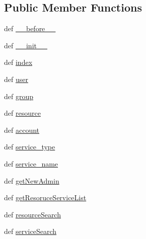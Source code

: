 \subsection*{\-Public \-Member \-Functions}
\begin{DoxyCompactItemize}
\item 
def \hyperlink{classcyberweb_1_1controllers_1_1newadmin_1_1_newadmin_controller_aaf6cba7e0a7b3e921f8355aafdafc609}{\-\_\-\-\_\-before\-\_\-\-\_\-}
\item 
def \hyperlink{classcyberweb_1_1controllers_1_1newadmin_1_1_newadmin_controller_aab476c078dd290a5cf3b643f9bf8e8d4}{\-\_\-\-\_\-init\-\_\-\-\_\-}
\item 
def \hyperlink{classcyberweb_1_1controllers_1_1newadmin_1_1_newadmin_controller_a6c8dd4d55e3d3b15def61a85a56e76fd}{index}
\item 
def \hyperlink{classcyberweb_1_1controllers_1_1newadmin_1_1_newadmin_controller_afc9e40abb143c53fe42cefa526716f1c}{user}
\item 
def \hyperlink{classcyberweb_1_1controllers_1_1newadmin_1_1_newadmin_controller_ae91321ebd95f40dca03ee571f0202170}{group}
\item 
def \hyperlink{classcyberweb_1_1controllers_1_1newadmin_1_1_newadmin_controller_a98337caf93ebf62d7ca3c66996241222}{resource}
\item 
def \hyperlink{classcyberweb_1_1controllers_1_1newadmin_1_1_newadmin_controller_a6769fe333b1b44e3bb5adb39837c4d45}{account}
\item 
def \hyperlink{classcyberweb_1_1controllers_1_1newadmin_1_1_newadmin_controller_a0f7feb5b2e35d71b4eb3e05236e31f28}{service\-\_\-type}
\item 
def \hyperlink{classcyberweb_1_1controllers_1_1newadmin_1_1_newadmin_controller_a32f43faab6b60baa37f41ffdf1782a66}{service\-\_\-name}
\item 
def \hyperlink{classcyberweb_1_1controllers_1_1newadmin_1_1_newadmin_controller_a56d28e6b3cdf25f7c164c2166369c962}{get\-New\-Admin}
\item 
def \hyperlink{classcyberweb_1_1controllers_1_1newadmin_1_1_newadmin_controller_a3704d29389b10f6acdaea9422c424316}{get\-Resoruce\-Service\-List}
\item 
def \hyperlink{classcyberweb_1_1controllers_1_1newadmin_1_1_newadmin_controller_acd61857813564aa1944fb2f09cf406ff}{resource\-Search}
\item 
def \hyperlink{classcyberweb_1_1controllers_1_1newadmin_1_1_newadmin_controller_ab76a8e6a84c5ff2c03597a90a8b675f6}{service\-Search}
\item 

\end{DoxyCompactItemize}
